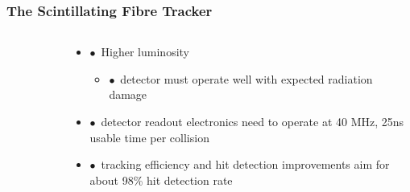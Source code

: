 \documentclass[aspectratio=1610, 12pt]{beamer}
\begin{document}
\begin{frame}\frametitle{The Scintillating Fibre Tracker}
  \begin{columns}
    \begin{column}[c]{0.48\textwidth}
      \begin{figure}


      \end{figure}
    \end{column}
    \begin{column}[c]{0.48\textwidth}
      \begin{itemize}
        \item $\bullet$\, Higher luminosity
        \begin{itemize}
          \item $\bullet$\, detector must operate well with expected radiation damage
        \end{itemize}
        \item $\bullet$\, detector readout electronics need to operate at 40 MHz, 25ns usable time per collision
        \item $\bullet$\, tracking efficiency and hit detection improvements aim for about 98\% hit detection rate
      \end{itemize}
    \end{column}
  \end{columns}
\end{frame}
\end{document}
